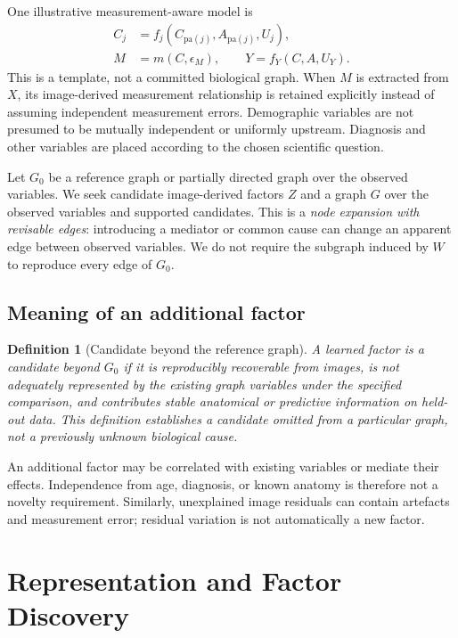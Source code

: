 \documentclass[10pt,twocolumn,letterpaper]{article}
\newcommand{\pa}{\mathrm{pa}}
\newtheorem{definition}{Definition}
\begin{document}
One illustrative measurement-aware model is
\begin{align}
 C_j &= f_j(C_{\pa(j)},A_{\pa(j)},U_j), \label{eq:anatomical-scm}\\
 M &= m(C,\epsilon_M),\qquad Y=f_Y(C,A,U_Y).
\end{align}
This is a template, not a committed biological graph. When $M$ is extracted from $X$, its image-derived measurement relationship is retained explicitly instead of assuming independent measurement errors. Demographic variables are not presumed to be mutually independent or uniformly upstream. Diagnosis and other variables are placed according to the chosen scientific question.

Let $G_0$ be a reference graph or partially directed graph over the observed variables. We seek candidate image-derived factors $Z$ and a graph $G$ over the observed variables and supported candidates. This is a \emph{node expansion with revisable edges}: introducing a mediator or common cause can change an apparent edge between observed variables. We do not require the subgraph induced by $W$ to reproduce every edge of $G_0$.

\subsection{Meaning of an additional factor}

\begin{definition}[Candidate beyond the reference graph]
A learned factor is a candidate beyond $G_0$ if it is reproducibly recoverable from images, is not adequately represented by the existing graph variables under the specified comparison, and contributes stable anatomical or predictive information on held-out data. This definition establishes a candidate omitted from a particular graph, not a previously unknown biological cause.
\end{definition}

An additional factor may be correlated with existing variables or mediate their effects. Independence from age, diagnosis, or known anatomy is therefore not a novelty requirement. Similarly, unexplained image residuals can contain artefacts and measurement error; residual variation is not automatically a new factor.

\section{Representation and Factor Discovery}
\label{sec:method}
\end{document}
